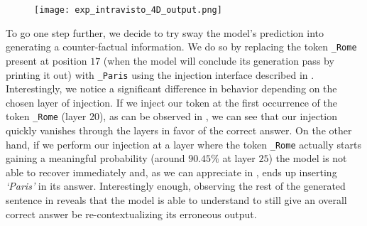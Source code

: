 \begin{figure}[t!]
    \centering
    \texttt{[image: exp\_intravisto\_4D\_output.png]}
    \label{fig:exp_intravisto_4_D3}
\end{figure}

To go one step further, we decide to try  sway the model's prediction into generating a counter-factual information.
We do so by replacing the token \texttt{\_Rome} present at position $17$ (when the model will conclude its generation pass by printing it out) with \texttt{\_Paris} using the injection interface described in .
Interestingly, we notice a significant difference in behavior depending on the chosen layer of injection.
If we inject our token at the first occurrence of the token \texttt{\_Rome} (layer $20$), as can be observed in , we can see that our injection quickly vanishes through the layers in favor of the correct answer.
On the other hand, if we perform our injection at a layer where the token \texttt{\_Rome} actually starts gaining a meaningful probability (around $90.45\%$ at layer $25$) the model is not able to recover immediately and, as we can appreciate in , ends up inserting \emph{`Paris'} in its answer.
Interestingly enough, observing the rest of the generated sentence in  reveals that the model is able to understand to still give an overall correct answer be re-contextualizing its erroneous output.

\begin{figure}[t!]
    \centering
    \label{fig:exp_intravisto_4_E}
\end{figure}

